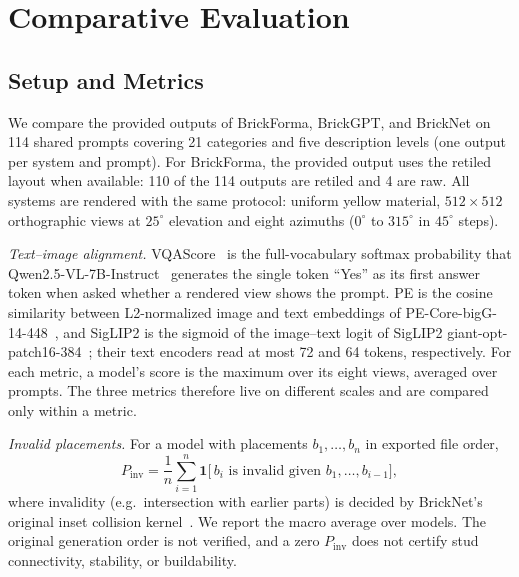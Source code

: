 \documentclass[letterpaper]{article} %
\begin{document}
\section{Comparative Evaluation}
\label{sec:eval}
\subsection{Setup and Metrics}
\label{sec:setup}
We compare the provided outputs of BrickForma, BrickGPT, and BrickNet on 114 shared prompts covering 21 categories and five description levels (one output per system and prompt). For BrickForma, the provided output uses the retiled layout when available: 110 of the 114 outputs are retiled and 4 are raw. All systems are rendered with the same protocol: uniform yellow material, $512{\times}512$ orthographic views at $25^{\circ}$ elevation and eight azimuths ($0^{\circ}$ to $315^{\circ}$ in $45^{\circ}$ steps).

\emph{Text--image alignment.} VQAScore~\cite{vqascore} is the full-vocabulary softmax probability that Qwen2.5-VL-7B-Instruct~\cite{qwen25vl} generates the single token ``Yes'' as its first answer token when asked whether a rendered view shows the prompt. PE is the cosine similarity between L2-normalized image and text embeddings of PE-Core-bigG-14-448~\cite{pe}, and SigLIP2 is the sigmoid of the image--text logit of SigLIP2 giant-opt-patch16-384~\cite{siglip2}; their text encoders read at most 72 and 64 tokens, respectively. For each metric, a model's score is the maximum over its eight views, averaged over prompts. The three metrics therefore live on different scales and are compared only within a metric.

\emph{Invalid placements.} For a model with placements $b_1,\ldots,b_n$ in exported file order,
\begin{equation}
P_{\mathrm{inv}} = \frac{1}{n}\sum_{i=1}^{n}\mathbf{1}\big[\,b_i \text{ is invalid given } b_1,\ldots,b_{i-1}\big],
\end{equation}
where invalidity (e.g.\ intersection with earlier parts) is decided by BrickNet's original inset collision kernel~\cite{bricknet}. We report the macro average over models. The original generation order is not verified, and a zero $P_{\mathrm{inv}}$ does not certify stud connectivity, stability, or buildability.
\end{document}
